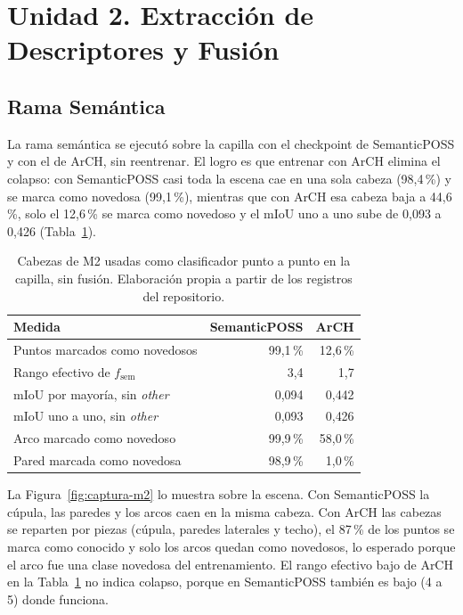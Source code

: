 \section[Unidad 2. Extracción de Descriptores y Fusión]{Unidad 2. Extracción de Descriptores y Fusión}
\label{sec:res-unidad2}

\FloatBarrier
\subsection[Rama Semántica]{Rama Semántica}
\label{sec:res-rama-sem}

La rama semántica se ejecutó sobre la capilla con el checkpoint de SemanticPOSS y con el
de ArCH, sin reentrenar. El logro es que entrenar con ArCH elimina el colapso: con
SemanticPOSS casi toda la escena cae en una sola cabeza (98{,}4\,\%) y se marca como
novedosa (99{,}1\,\%), mientras que con ArCH esa cabeza baja a 44{,}6\,\%, solo el
12{,}6\,\% se marca como novedoso y el mIoU uno a uno sube de 0{,}093 a 0{,}426
(Tabla~\ref{tab:m2-novedoso}).

\begin{table}[!htbp]
\centering
{}\small
\caption[M2 como clasificador punto a punto en la capilla]{Cabezas de M2 usadas como clasificador punto a punto en la capilla, sin fusión. Elaboración propia a partir de los registros del repositorio.}
\label{tab:m2-novedoso}
\begin{tabular}{@{}lrr@{}}
\toprule
\textbf{Medida} & \textbf{SemanticPOSS} & \textbf{ArCH} \\
\midrule
Puntos marcados como novedosos & 99{,}1\,\% & 12{,}6\,\% \\
Rango efectivo de $f_{\mathrm{sem}}$ & 3{,}4 & 1{,}7 \\
mIoU por mayoría, sin \emph{other} & 0{,}094 & 0{,}442 \\
mIoU uno a uno, sin \emph{other} & 0{,}093 & 0{,}426 \\
Arco marcado como novedoso & 99{,}9\,\% & 58{,}0\,\% \\
Pared marcada como novedosa & 98{,}9\,\% & 1{,}0\,\% \\
\bottomrule
\end{tabular}
\end{table}

La Figura~\ref{fig:captura-m2} lo muestra sobre la escena. Con SemanticPOSS la cúpula,
las paredes y los arcos caen en la misma cabeza. Con ArCH las cabezas se reparten por
piezas (cúpula, paredes laterales y techo), el 87\,\% de los puntos se marca como
conocido y solo los arcos quedan como novedosos, lo esperado porque el arco fue una
clase novedosa del entrenamiento. El rango efectivo bajo de ArCH en la
Tabla~\ref{tab:m2-novedoso} no indica colapso, porque en SemanticPOSS también es bajo
(4 a 5) donde funciona.

